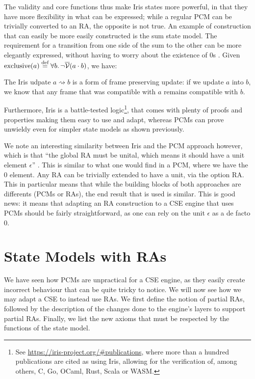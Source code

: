 The validity and core functions thus make Iris states more powerful, in that they have more flexibility in what can be expressed; while a regular PCM can be trivially converted to an RA, the opposite is not true. An example of construction that can easily be more easily constructed is the sum state model. The requirement for a transition from one side of the sum to the other can be more elegantly expressed, without having to worry about the existence of $0$s \cite{iris}. Given ${\text{exclusive}(a)\defeq \forall b\ldotp \neg\irisval(a\cdot b)}$, we have:\begin{mathpar}
\end{mathpar}

The Iris udpate $a \rightsquigarrow b$ is a form of frame preserving update: if we update $a$ into $b$, we know that any frame that was compatible with $a$ remains compatible with $b$.

Furthermore, Iris is a battle-tested logic\footnote{See \url{https://iris-project.org/\#publications}, where more than a hundred publications are cited as using Iris, allowing for the verification of, among others, C, Go, OCaml, Rust, Scala or WASM.}, that comes with plenty of proofs and properties making them easy to use and adapt, whereas PCMs can prove unwieldy even for simpler state models as shown previously.

We note an interesting similarity between Iris and the PCM approach however, which is that ``the global RA must be unital, which means it should have a unit element $\epsilon$'' \cite{iris}. This is similar to what one would find in a PCM, where we have the $0$ element. Any RA can be trivially extended to have a unit, via the option RA. This in particular means that while the building blocks of both approaches are differents (PCMs or RAs), the end result that is used is similar. This is good news: it means that adapting an RA construction to a CSE engine that uses PCMs should be fairly straightforward, as one can rely on the unit $\epsilon$ as a de facto $0$.

\section{State Models with RAs} \label{sec:theory-state-model-ras}

We have seen how PCMs are unpractical for a CSE engine, as they easily create incorrect behaviour that can be quite tricky to notice. We will now see how we may adapt a CSE to instead use RAs. We first define the notion of partial RAs, followed by the description of the changes done to the engine's layers to support partial RAs. Finally, we list the new axioms that must be respected by the functions of the state model.

